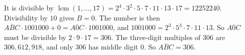 It is divisible by $\operatorname{lcm}(1,\dots,17)=2^4\cdot3^2\cdot5\cdot7\cdot11\cdot13\cdot17=12252240$. Divisibility by $10$ gives $B=0$. The number is then $\overline{ABC}\cdot1001000+0=\overline{A0C}\cdot1001000$, and $1001000=2^3\cdot5^3\cdot7\cdot11\cdot13$. So $\overline{A0C}$ must be divisible by $2\cdot9\cdot17=306$. The three-digit multiples of $306$ are $306,612,918$, and only $306$ has middle digit $0$. So $\overline{ABC}=\boxed{306}$.
